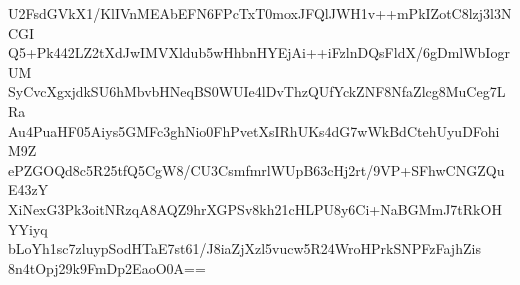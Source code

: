 U2FsdGVkX1/KlIVnMEAbEFN6FPcTxT0moxJFQlJWH1v++mPkIZotC8lzj3l3NCGI
Q5+Pk442LZ2tXdJwIMVXldub5wHhbnHYEjAi++iFzlnDQsFldX/6gDmlWbIogrUM
SyCvcXgxjdkSU6hMbvbHNeqBS0WUIe4lDvThzQUfYckZNF8NfaZlcg8MuCeg7LRa
Au4PuaHF05Aiys5GMFc3ghNio0FhPvetXsIRhUKs4dG7wWkBdCtehUyuDFohiM9Z
ePZGOQd8c5R25tfQ5CgW8/CU3CsmfmrlWUpB63cHj2rt/9VP+SFhwCNGZQuE43zY
XiNexG3Pk3oitNRzqA8AQZ9hrXGPSv8kh21cHLPU8y6Ci+NaBGMmJ7tRkOHYYiyq
bLoYh1sc7zluypSodHTaE7st61/J8iaZjXzl5vucw5R24WroHPrkSNPFzFajhZis
8n4tOpj29k9FmDp2EaoO0A==
